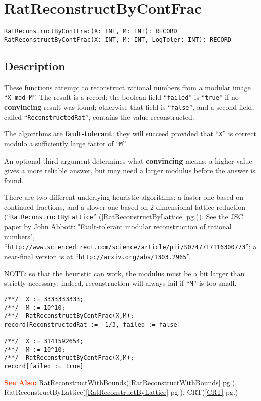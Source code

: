 \documentclass[a4paper]{mybook}
\newenvironment{command}{}{} %
\newcommand\SeeAlso{\par\textcolor{OrangeRed}{\textbf{\large See Also: }}}
\begin{document}
\section{RatReconstructByContFrac}
\label{RatReconstructByContFrac}
\begin{command} %


\begin{Verbatim}[label=syntax, rulecolor=\color{MidnightBlue},
frame=single]
RatReconstructByContFrac(X: INT, M: INT): RECORD
RatReconstructByContFrac(X: INT, M: INT, LogToler: INT): RECORD
\end{Verbatim}


\subsection*{Description}

These functions attempt to reconstruct rational numbers from a modular
image ``\verb&X mod M&''.
The result is a record: the boolean field ``\verb&failed&'' is ``\verb&true&''
if no \textbf{convincing} result was found; otherwise that field is ``\verb&false&'',
and a second field, called ``\verb&ReconstructedRat&'', contains the
value reconstructed.
\par 
The algorithms are \textbf{fault-tolerant}: they will succeed provided that
``\verb&X&'' is correct modulo a sufficiently large factor of ``\verb&M&''.
\par 
An optional third argument determines what \textbf{convincing} means: a higher
value gives a more reliable answer, but may need a larger modulus before the
answer is found.
\par 
There are two different underlying heuristic algorithms: a faster one
based on continued fractions, and a slower one based on 2-dimensional
lattice reduction (``\verb&RatReconstructByLattice&'' (\ref{RatReconstructByLattice} pg.\pageref{RatReconstructByLattice})).  
See the JSC paper by John Abbott:
"Fault-tolerant modular reconstruction of rational numbers",
``\verb&http://www.sciencedirect.com/science/article/pii/S0747717116300773&'';
a near-final version is at ``\verb&http://arxiv.org/abs/1303.2965&''.
\par 
NOTE: so that the heuristic can work, the modulus must be a bit larger
than strictly necessary; indeed, reconstruction will always fail if ``\verb&M&''
is too small.
\begin{Verbatim}[label=example, rulecolor=\color{PineGreen}, frame=single]
/**/  X := 3333333333;
/**/  M := 10^10;
/**/  RatReconstructByContFrac(X,M);
record[ReconstructedRat := -1/3, failed := false]

/**/  X := 3141592654;
/**/  M := 10^10;
/**/  RatReconstructByContFrac(X,M);
record[failed := true]
\end{Verbatim}


\SeeAlso %
  RatReconstructWithBounds(\ref{RatReconstructWithBounds} pg.\pageref{RatReconstructWithBounds}), 
    RatReconstructByLattice(\ref{RatReconstructByLattice} pg.\pageref{RatReconstructByLattice}), 
    CRT(\ref{CRT} pg.\pageref{CRT})
\end{command} %
\end{document}
